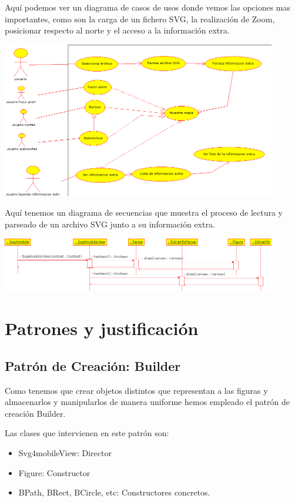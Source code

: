 \documentclass[a4paper,10pt]{article}
\begin{document}
Aquí podemos ver un diagrama de casos de usos donde vemos las opciones mas importantes, como son la carga de un fichero SVG,  la realización de Zoom, posicionar respecto al norte y el acceso a la información extra.

\begin{center}
 \includegraphics[width=12cm]{texres/caso_de_uso.png}
\end{center}

Aquí tenemos un diagrama de secuencias que muestra el proceso de lectura y parseado de un archivo SVG junto a su información extra.

\begin{center}
 \includegraphics[width=12cm]{texres/secuencia.png}
\end{center}

\clearpage
\section{Patrones y justificación}

\subsection{Patrón de Creación: Builder}

Como tenemos que crear objetos distintos que representan a las figuras y almacenarlos y manipularlos de manera uniforme hemos empleado el patrón de creación Builder.

Las clases que intervienen en este patrón son:
\begin{itemize}
\item Svg4mobileView: Director
\item Figure: Constructor
\item BPath, BRect, BCircle, etc: Constructores concretos.
\end{itemize}
\end{document}
